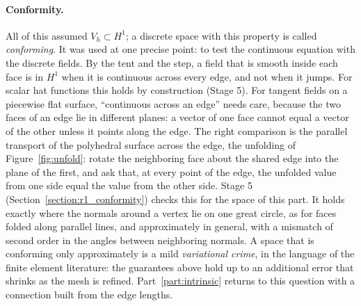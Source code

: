 \paragraph{Conformity.} All of this assumed $V_h \subset H^1$; a discrete space with this property is called \emph{conforming}. It was used at one precise point: to test the continuous equation with the discrete fields. By the tent and the step, a field that is smooth inside each face is in $H^1$ when it is continuous across every edge, and not when it jumps. For scalar hat functions this holds by construction (Stage 5). For tangent fields on a piecewise flat surface, ``continuous across an edge'' needs care, because the two faces of an edge lie in different planes: a vector of one face cannot equal a vector of the other unless it points along the edge. The right comparison is the parallel transport of the polyhedral surface across the edge, the unfolding of Figure~\ref{fig:unfold}: rotate the neighboring face about the shared edge into the plane of the first, and ask that, at every point of the edge, the unfolded value from one side equal the value from the other side. Stage 5 (Section~\ref{section:r1_conformity}) checks this for the space of this part. It holds exactly where the normals around a vertex lie on one great circle, as for faces folded along parallel lines, and approximately in general, with a mismatch of second order in the angles between neighboring normals. A space that is conforming only approximately is a mild \emph{variational crime}, in the language of the finite element literature: the guarantees above hold up to an additional error that shrinks as the mesh is refined. Part~\ref{part:intrinsic} returns to this question with a connection built from the edge lengths.

